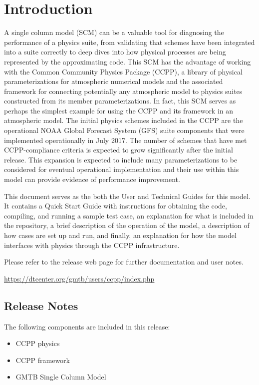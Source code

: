 \chapter{Introduction}
\label{chapter: introduction}
\setlength{\parskip}{12pt}

A single column model (SCM) can be a valuable tool for diagnosing the performance of a physics suite, from validating that schemes have been integrated into a suite correctly to deep dives into how physical processes are being represented by the approximating code. This SCM has the advantage of working with the Common Community Physics Package (CCPP), a library of physical parameterizations for atmospheric numerical models and the associated framework for connecting potentially any atmospheric model to physics suites constructed from its member parameterizations. In fact, this SCM serves as perhaps the simplest example for using the CCPP and its framework in an atmospheric model. The initial physics schemes included in the CCPP are the operational NOAA Global Forecast System (GFS) suite components that were implemented operationally in July 2017. The number of schemes that have met CCPP-compliance criteria is expected to grow significantly after the initial release. This expansion is expected to include many parameterizations to be considered for eventual operational implementation and their use within this model can provide evidence of performance improvement.

This document serves as the both the User and Technical Guides for this model. It contains a Quick Start Guide with instructions for obtaining the code, compiling, and running a sample test case, an explanation for what is included in the repository, a brief description of the operation of the model, a description of how cases are set up and run, and finally, an explanation for how the model interfaces with physics through the CCPP infrastructure.

Please refer to the release web page for further documentation and user notes.

\url{https://dtcenter.org/gmtb/users/ccpp/index.php}

\section{Release Notes}

The following components are included in this release:

\begin{itemize}
	\item CCPP physics
	\item CCPP framework
	\item GMTB Single Column Model
\end{itemize} 






